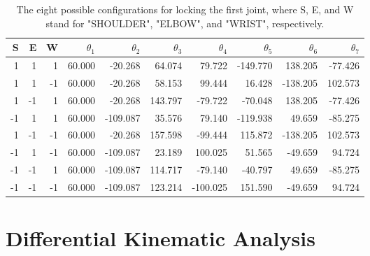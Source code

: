 \documentclass{article}
\begin{document}
\begin{table}[h]
\centering
\begin{tabular}{*{10}{r}}
\toprule
S & E & W & $\theta_1$ & $\theta_2$ & $\theta_3$ & $\theta_4$ & $\theta_5$ & $\theta_6$ & $\theta_7$ \\
\midrule
 1 &  1 &  1 & 60.000 &  -20.268   &  64.074 &   79.722 & -149.770 &  138.205 & -77.426 \\
 1 &  1 & -1 & 60.000 &  -20.268   &  58.153 &   99.444 &   16.428 & -138.205 & 102.573 \\
 1 & -1 &  1 & 60.000 &  -20.268   & 143.797 &  -79.722 &  -70.048 &  138.205 & -77.426 \\
-1 &  1 &  1 & 60.000 & -109.087   &  35.576 &   79.140 & -119.938 &   49.659 & -85.275 \\
 1 & -1 & -1 & 60.000 &  -20.268   & 157.598 &  -99.444 &  115.872 & -138.205 & 102.573 \\
-1 &  1 & -1 & 60.000 & -109.087   &  23.189 &  100.025 &   51.565 &  -49.659 &  94.724 \\
-1 & -1 &  1 & 60.000 & -109.087   & 114.717 &  -79.140 &  -40.797 &   49.659 & -85.275 \\
-1 & -1 & -1 & 60.000 & -109.087   & 123.214 & -100.025 &  151.590 &  -49.659 &  94.724 \\
\bottomrule
\end{tabular}
\caption{The eight possible configurations for locking the first joint, where S, E, and W stand for "SHOULDER", "ELBOW", and "WRIST", respectively.}
\end{table}

\section{Differential Kinematic Analysis}
\end{document}
